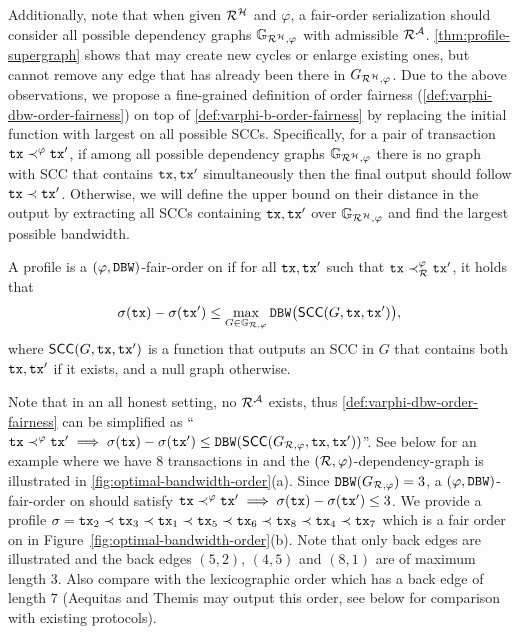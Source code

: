Additionally, note that when given $\mathcal{R}^\mathcal{H}$ and $\varphi$, a fair-order serialization should consider all possible dependency graphs $\mathbb{G}_{\mathcal{R}^\mathcal{H}, \varphi}$ with admissible $\mathcal{R}^\mathcal{A}$.
%
\cref{thm:profile-supergraph} shows that \adv may create new cycles or enlarge existing ones, but \adv cannot remove any edge that has already been there in $G_{\mathcal{R}^\mathcal{H}, \varphi}$.
%
Due to the above observations, we propose a fine-grained definition of order fairness (\cref{def:varphi-dbw-order-fairness}) on top of \cref{def:varphi-b-order-fairness} by replacing the initial function with largest \DBW on all possible SCCs.
%
Specifically, for a pair of transaction $\mathtt{tx} \prec^\varphi \mathtt{tx}'$, if among all possible dependency graphs $\mathbb{G}_{\mathcal{R}^\mathcal{H}, \varphi}$ there is no graph with SCC that contains $\mathtt{tx}, \mathtt{tx}'$ simultaneously then the final output should follow $\mathtt{tx} \prec \mathtt{tx}'$.
%
Otherwise, we will define the upper bound on their distance in the output by extracting all SCCs containing $\mathtt{tx}, \mathtt{tx}'$ over $\mathbb{G}_{\mathcal{R}^\mathcal{H}, \varphi}$ and find the largest possible bandwidth.

\begin{definition}
    \label{def:varphi-dbw-order-fairness}

    A profile \orderOutput is a $(\varphi, \mathtt{DBW})$-fair-order on \profileSet if for all $\mathtt{tx}, \mathtt{tx}'$ such that $\mathtt{tx} \prec^\varphi_\mathcal{R} \mathtt{tx}'$, it holds that
    \[ \sigma(\mathtt{tx}) - \sigma(\mathtt{tx}') \le \max_{G \in \mathbb{G}_{\mathcal{R}, \varphi}} \mathtt{DBW} \big( \mathsf{SCC}(G, \mathtt{tx}, \mathtt{tx}') \big), \]
    where $\mathsf{SCC}(G, \mathtt{tx}, \mathtt{tx}')$ is a function that outputs an SCC in $G$ that contains both $\mathtt{tx}, \mathtt{tx}'$ if it exists, and a null graph otherwise.
\end{definition}

Note that in an all honest setting, no $\mathcal{R}^\mathcal{A}$ exists, thus \cref{def:varphi-dbw-order-fairness} can be simplified as ``$\mathtt{tx} \prec^\varphi \mathtt{tx}' \implies \sigma(\mathtt{tx}) - \sigma(\mathtt{tx}') \le \mathtt{DBW} (\mathsf{SCC}(G_{\mathcal{R}, \varphi}, \mathtt{tx}, \mathtt{tx}'))$''.
%
See below for an example where we have 8 transactions in \profileSet and the $(\mathcal{R}, \varphi)$-dependency-graph is illustrated in \cref{fig:optimal-bandwidth-order}(a).
%
Since $\mathtt{DBW}(G_{\mathcal{R}, \varphi}) = 3$, a $(\varphi, \mathtt{DBW})$-fair-order on \profileSet should satisfy $\mathtt{tx} \prec^\varphi \mathtt{tx}' \implies \sigma(\mathtt{tx}) - \sigma(\mathtt{tx}') \le 3$.
%
We provide a profile $\sigma = \mathtt{tx}_2 \prec \mathtt{tx}_3 \prec \mathtt{tx}_1 \prec \mathtt{tx}_5 \prec \mathtt{tx}_6 \prec \mathtt{tx}_8 \prec \mathtt{tx}_4 \prec \mathtt{tx}_7$ which is a fair order on \profileSet in Figure~\cref{fig:optimal-bandwidth-order}(b).
%
Note that only back edges are illustrated and the back edges $(5, 2)$, $(4, 5)$ and $(8, 1)$ are of maximum length $3$.
%
Also compare with the lexicographic order which has a back edge of length $7$ (\textsf{Aequitas} and \textsf{Themis} may output this order, see below for comparison with existing protocols).

